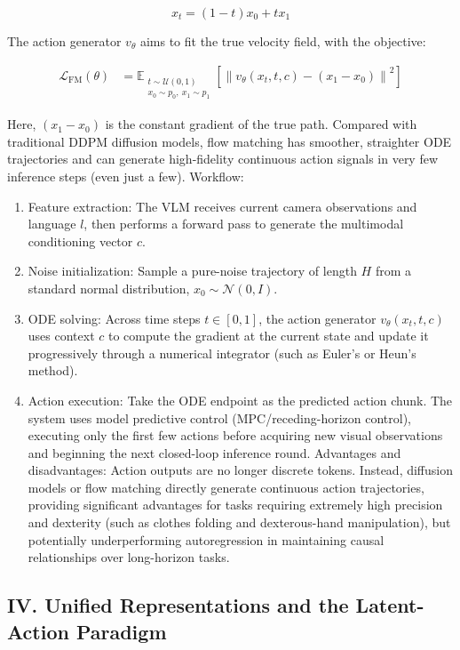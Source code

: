 \[
x_t=(1-t)x_0+t x_1
\]

The action generator \(v_\theta\) aims to fit the true velocity field, with the objective:

\[
\begin{aligned}
\mathcal{L}_{\mathrm{FM}}(\theta)
&=
\mathbb{E}_{\substack{t\sim \mathcal{U}(0,1)\\ x_0\sim p_0,\ x_1\sim p_1}}
\left[
\left\|v_\theta(x_t,t,c)-(x_1-x_0)\right\|^2
\right]
\end{aligned}
\]

Here, \((x_1-x_0)\) is the constant gradient of the true path. Compared with traditional DDPM diffusion models, flow matching has smoother, straighter ODE trajectories and can generate high-fidelity continuous action signals in very few inference steps (even just a few).
Workflow:

\begin{enumerate}
\def\labelenumi{\arabic{enumi}.}
\item
  Feature extraction: The VLM receives current camera observations and language \(l\), then performs a forward pass to generate the multimodal conditioning vector \(c\).
\item
  Noise initialization: Sample a pure-noise trajectory of length \(H\) from a standard normal distribution, \(x_0\sim\mathcal{N}(0,I)\).
\item
  ODE solving: Across time steps \(t\in[0,1]\), the action generator \(v_\theta(x_t,t,c)\) uses context \(c\) to compute the gradient at the current state and update it progressively through a numerical integrator (such as Euler's or Heun's method).
\item
  Action execution: Take the ODE endpoint as the predicted action chunk. The system uses model predictive control (MPC/receding-horizon control), executing only the first few actions before acquiring new visual observations and beginning the next closed-loop inference round.
  Advantages and disadvantages: Action outputs are no longer discrete tokens. Instead, diffusion models or flow matching directly generate continuous action trajectories, providing significant advantages for tasks requiring extremely high precision and dexterity (such as clothes folding and dexterous-hand manipulation), but potentially underperforming autoregression in maintaining causal relationships over long-horizon tasks.
\end{enumerate}

\hypertarget{iv.-unified-representations-and-the-latent-action-paradigm}{%
\subsection{IV. Unified Representations and the Latent-Action Paradigm}\label{iv.-unified-representations-and-the-latent-action-paradigm}}

